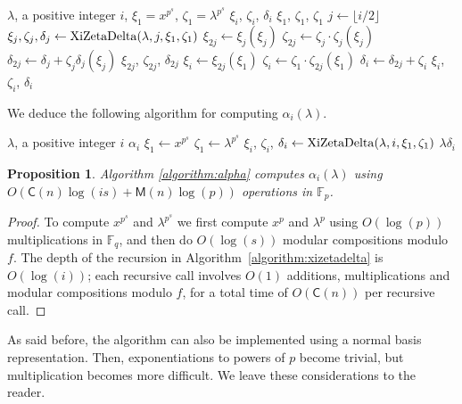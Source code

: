 \documentclass[12pt]{article}
\theoremstyle{plain}
\newtheorem{proposition}[theorem]{Proposition}
\theoremstyle{definition}
\newcommand{\refalgorithm}[1]{Algorithm \ref{#1}}
\def\F{\mathbb{F}}
\def\M{\mathsf{M}}
\def\CC{\mathsf{C}}
\newcounter{algorithm}
\begin{document}
\begin{algorithm}
\label{algorithm:xizetadelta}
\begin{algorithmic}[1]
\REQUIRE $\lambda$, a positive integer $i$, $\xi_1=x^{p^s}$, $\zeta_1=\lambda^{p^s}$
\ENSURE $\xi_i$, $\zeta_i$, $\delta_i$
\RETURN $\xi_1$, $\zeta_1$, $\zeta_1$
\ENDIF
\STATE $j \leftarrow \lfloor i/2\rfloor$
\STATE $\xi_{j},\zeta_{j},\delta_j \leftarrow {\rm XiZetaDelta}(\lambda,j,\xi_1,\zeta_1)$ 
\STATE $\xi_{2j} \leftarrow \xi_j(\xi_j)$
\STATE $\zeta_{2j} \leftarrow \zeta_j\cdot \zeta_j(\xi_j)$
\STATE $\delta_{2j}\leftarrow \delta_j+\zeta_j \delta_j(\xi_j)$
\RETURN $\xi_{2j}$, $\zeta_{2j}$, $\delta_{2j}$
\ENDIF
\STATE $\xi_i \leftarrow \xi_{2j}(\xi_1)$
\STATE $\zeta_i \leftarrow \zeta_1\cdot \zeta_{2j}(\xi_1)$
\STATE $\delta_i \leftarrow \delta_{2j}+\zeta_i$
\RETURN $\xi_i$, $\zeta_i$, $\delta_i$
\end{algorithmic}
\end{algorithm}
We deduce the following algorithm for computing $\alpha_i(\lambda)$.

\begin{algorithm}
\label{algorithm:alpha}
\begin{algorithmic}[1]
\REQUIRE $\lambda$, a positive integer $i$
\ENSURE $\alpha_i$
\STATE $\xi_1 \leftarrow x^{p^s}$
\STATE $\zeta_1 \leftarrow \lambda^{p^s}$
\STATE $\xi_i$, $\zeta_i$, $\delta_i \leftarrow {\rm XiZetaDelta}(\lambda,i,\xi_1,\zeta_1)$ 
\RETURN $\lambda \delta_i$
\end{algorithmic}
\end{algorithm}

\begin{proposition}
  \refalgorithm{algorithm:alpha} computes $\alpha_i(\lambda)$ using
  $O(\CC(n)\log(is) + \M(n)\log(p))$ operations in $\F_p$.
\end{proposition}
\begin{proof}
  To compute $x^{p^s}$ and $\lambda^{p^s}$ we first compute $x^p$ and
  $\lambda^p$ using $O(\log(p))$ multiplications in $\F_q$, and then
  do $O(\log (s))$ modular compositions modulo $f$. The depth of the
  recursion in Algorithm~\ref{algorithm:xizetadelta} is $O(\log(i))$;
  each recursive call involves $O(1)$ additions, multiplications and
  modular compositions modulo $f$, for a total time of $O(\CC(n))$ per
  recursive call.
\end{proof}

As said before, the algorithm can also be implemented using a normal
basis representation. Then, exponentiations to powers of $p$ become
trivial, but multiplication becomes more difficult. We leave these
considerations to the reader.
\end{document}
